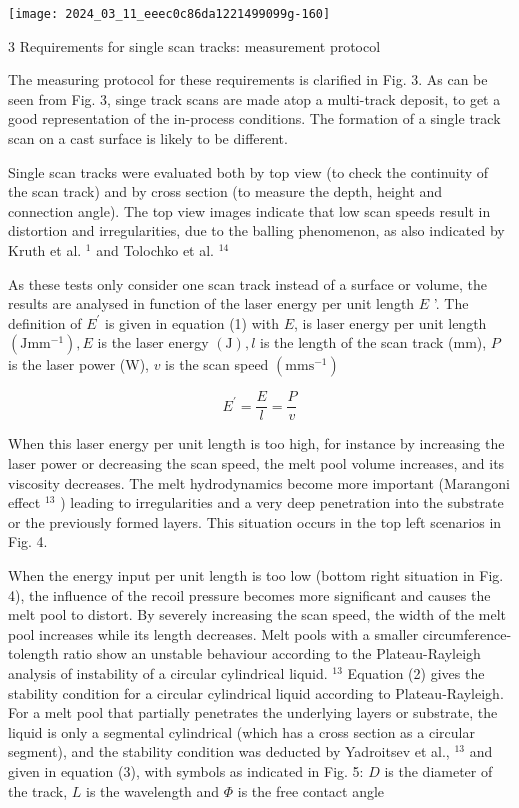 \documentclass[10pt]{article}
\begin{document}
\begin{center}
\texttt{[image: 2024\_03\_11\_eeec0c86da1221499099g-160]}
\end{center}

3 Requirements for single scan tracks: measurement protocol

The measuring protocol for these requirements is clarified in Fig. 3. As can be seen from Fig. 3, singe track scans are made atop a multi-track deposit, to get a good representation of the in-process conditions. The formation of a single track scan on a cast surface is likely to be different.

Single scan tracks were evaluated both by top view (to check the continuity of the scan track) and by cross section (to measure the depth, height and connection angle). The top view images indicate that low scan speeds result in distortion and irregularities, due to the balling phenomenon, as also indicated by Kruth et al. ${ }^{1}$ and Tolochko et al. ${ }^{14}$

As these tests only consider one scan track instead of a surface or volume, the results are analysed in function of the laser energy per unit length $E$ '. The definition of $E^{\prime}$ is given in equation (1) with $E$, is laser energy per unit length $\left(\mathrm{J} \mathrm{mm}^{-1}\right), E$ is the laser energy $(\mathrm{J}), l$ is the length of the scan track (mm), $P$ is the laser power (W), $v$ is the scan speed $\left(\mathrm{mm} \mathrm{s}^{-1}\right)$

$$
E^{\prime}=\frac{E}{l}=\frac{P}{v}
$$

When this laser energy per unit length is too high, for instance by increasing the laser power or decreasing the scan speed, the melt pool volume increases, and its viscosity decreases. The melt hydrodynamics become more important (Marangoni effect ${ }^{13}$ ) leading to irregularities and a very deep penetration into the substrate or the previously formed layers. This situation occurs in the top left scenarios in Fig. 4.

When the energy input per unit length is too low (bottom right situation in Fig. 4), the influence of the recoil pressure becomes more significant and causes the melt pool to distort. By severely increasing the scan speed, the width of the melt pool increases while its length decreases. Melt pools with a smaller circumference-tolength ratio show an unstable behaviour according to the Plateau-Rayleigh analysis of instability of a circular cylindrical liquid. ${ }^{13}$ Equation (2) gives the stability condition for a circular cylindrical liquid according to Plateau-Rayleigh. For a melt pool that partially penetrates the underlying layers or substrate, the liquid is only a segmental cylindrical (which has a cross section as a circular segment), and the stability condition was deducted by Yadroitsev et al., ${ }^{13}$ and given in equation (3), with symbols as indicated in Fig. 5: $D$ is the diameter of the track, $L$ is the wavelength and $\Phi$ is the free contact angle
\end{document}
